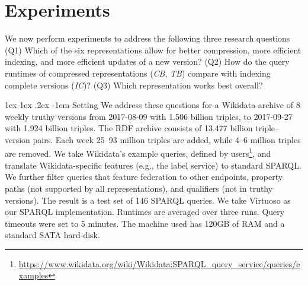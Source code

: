 \documentclass[a4paper]{llncs}
\makeatletter
\renewcommand\paragraph{\@startsection{paragraph}{4}{\z@}%
	{1ex \@plus1ex \@minus.2ex}%
	{-1em}%
	{\normalfont\normalsize\itshape}}
\makeatother
\begin{document}
%
%

\section{Experiments} 

We now perform experiments to address the following three research questions (Q1) Which of the six representations allow for better compression, more efficient indexing, and more efficient updates of a new version? (Q2) How do the query runtimes of compressed representations (\textit{CB}, \textit{TB}) compare with indexing complete versions (\textit{IC})? (Q3) Which representation works best overall? 

\paragraph{Setting} We address these questions for a Wikidata archive of 8 weekly truthy versions from 2017-08-09 with 1.506 billion triples, to 2017-09-27 with 1.924 billion triples. The RDF archive consists of 13.477 billion triple--version pairs. Each week 25--93 million triples are added, while 4--6 million triples are removed. We take Wikidata's example queries, defined by users\footnote{\url{https://www.wikidata.org/wiki/Wikidata:SPARQL_query_service/queries/examples}}, and translate Wikidata-specific features (e.g., the label service) to standard SPARQL. We further filter queries that feature federation to other endpoints, property paths (not supported by all representations), and qualifiers (not in truthy versions). The result is a test set of 146 SPARQL queries. We take Virtuoso as our SPARQL implementation. Runtimes are averaged over three runs. Query timeouts were set to 5 minutes. The machine used has 120GB of RAM and a standard SATA hard-disk.
\end{document}
